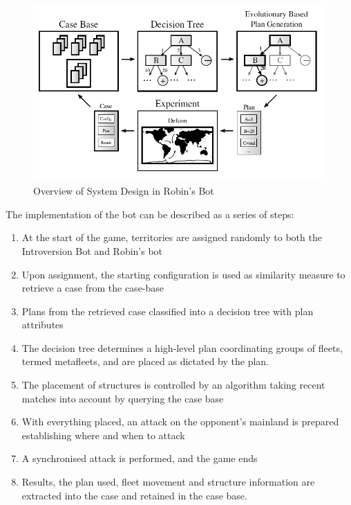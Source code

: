         \begin{figure}[htp]
            \begin{center}
            \includegraphics[scale=0.4]{images/robbot-design.png}
            \caption{Overview of System Design in Robin's Bot}
            \label{img:robbot-design}
            \end{center} 
        \end{figure}
        
        
        \newpage
        
        The implementation of the bot can be described as a series of steps:
        
        \begin{enumerate}
        \item At the start of the game, territories are assigned randomly to both the Introversion Bot and Robin's bot
        \item Upon assignment, the starting configuration is used as similarity measure to retrieve a case from the case-base
        \item Plans from the retrieved case classified into a decision tree with plan attributes
        \item The decision tree determines a high-level plan coordinating groups of fleets, termed metafleets, and are placed as dictated by the plan.
        \item The placement of structures is controlled by an algorithm taking recent matches into account by querying the case base
        \item With everything placed, an attack on the opponent's mainland is prepared establishing where and when to attack
        \item A synchronised attack is performed, and the game ends
        \item Results, the plan used, fleet movement and structure information  are extracted into the case and retained in the case base.
        \end{enumerate}        
        
